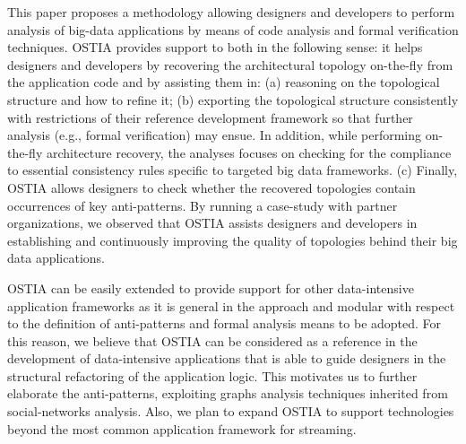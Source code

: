 
This paper proposes a methodology allowing designers and developers to perform analysis of big-data applications by means of code analysis and formal verification techniques.
OSTIA provides support to both in the following sense:
it helps designers and developers by recovering the architectural topology on-the-fly from the application code and by assisting them in: 
(a) reasoning on the topological structure and how to refine it; 
(b) exporting the topological structure consistently with restrictions of their reference development framework so that further analysis (e.g., formal verification) may ensue. In addition, while performing on-the-fly architecture recovery, the analyses focuses on checking for the compliance to essential consistency rules specific to targeted big data frameworks. 
(c) Finally, OSTIA allows designers to check whether the recovered topologies contain occurrences of key anti-patterns. By running a case-study with partner organizations, we observed that OSTIA assists designers and developers in establishing and continuously improving the quality of topologies behind their big data applications. 

OSTIA can be easily extended to provide support for other data-intensive application frameworks as it is general in the approach and modular with respect to the definition of anti-patterns and formal analysis means to be adopted.
For this reason, we believe that OSTIA can be considered as a reference in the development of data-intensive applications that is able to guide designers in the structural refactoring of the application logic.
This motivates us to further elaborate the anti-patterns, 
exploiting graphs analysis techniques inherited from social-networks analysis. Also, we plan to expand OSTIA to support technologies beyond the most common application framework for streaming. %


